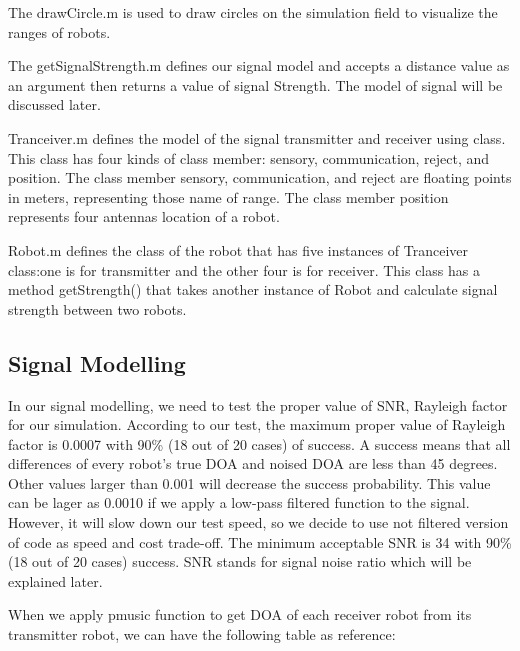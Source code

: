 The drawCircle.m is used to draw circles on the simulation field to visualize the ranges of robots.

The getSignalStrength.m defines our signal model and accepts a distance value as an argument then returns a value of signal Strength. The model of signal will be discussed later.

Tranceiver.m defines the model of the signal transmitter and receiver using class. This class has four kinds of class member: sensory, communication, reject, and position. The class member sensory, communication, and reject are floating points in meters, representing those name of range. The class member position represents four antennas location of a robot.

Robot.m defines the class of the robot that has five instances of Tranceiver class:one is for transmitter and the other four is for receiver. This class has a method getStrength() that takes another instance of Robot and calculate signal strength between two robots. 



\subsection{Signal Modelling}
In our signal modelling, we need to test the proper value of SNR, Rayleigh factor for our simulation. According to our test, the maximum proper value of Rayleigh factor is 0.0007 with 90\% (18 out of 20 cases) of success. A success means that all differences of every robot's true DOA and noised DOA are less than 45 degrees. Other values larger than 0.001 will decrease the success probability. This value can be lager as 0.0010 if we apply a low-pass filtered function to the signal. However, it will slow down our test speed, so we decide to use not filtered version of code as speed and cost trade-off. The minimum acceptable SNR is 34 with 90\%(18 out of 20 cases) success. SNR stands for signal noise ratio which will be explained later.
\par
	When we apply pmusic function to get DOA of each receiver robot from its transmitter robot, we can have the following table as reference:

